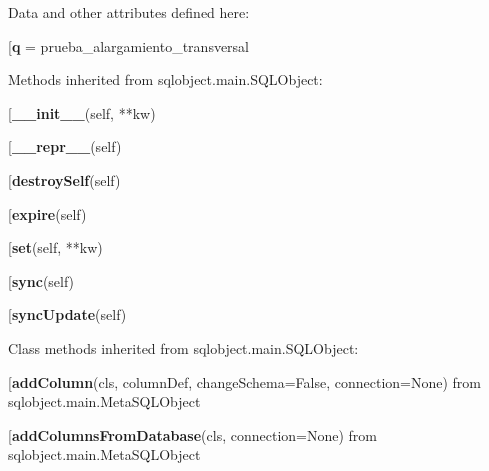 Data and other attributes defined here:\\
\begin{description}\item[{\bf q} = prueba\_alargamiento\_transversal\end{description}


Methods inherited from sqlobject.main.SQLObject:\\
\begin{description}\item[{\bf \_\_init\_\_}(self, **kw)\end{description}

\begin{description}\item[{\bf \_\_repr\_\_}(self)\end{description}

\begin{description}\item[{\bf destroySelf}(self)\end{description}

\begin{description}\item[{\bf expire}(self)\end{description}

\begin{description}\item[{\bf set}(self, **kw)\end{description}

\begin{description}\item[{\bf sync}(self)\end{description}

\begin{description}\item[{\bf syncUpdate}(self)\end{description}


Class methods inherited from sqlobject.main.SQLObject:\\
\begin{description}\item[{\bf addColumn}(cls, columnDef, changeSchema=False, connection=None) from sqlobject.main.MetaSQLObject\end{description}

\begin{description}\item[{\bf addColumnsFromDatabase}(cls, connection=None) from sqlobject.main.MetaSQLObject\end{description}

